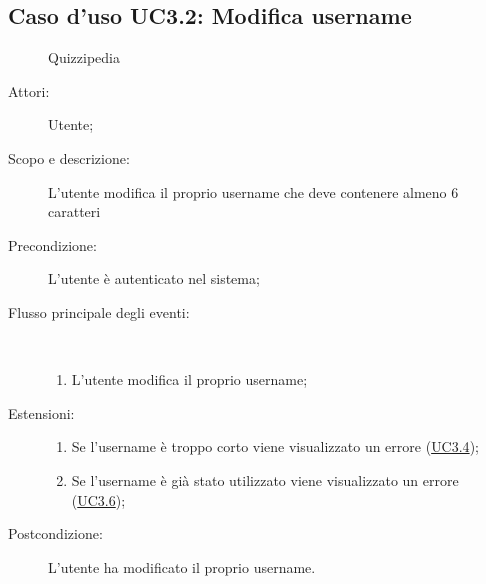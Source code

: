 \subsection{Caso d'uso UC3.2: Modifica username}
	\begin{figure}[H]
		\centering
		\begin{resizedtikzpicture}{\textwidth}
		\begin{umlsystem}[x=0, fill=lightgray!20]{Quizzipedia}
		\end{umlsystem}
		\end{resizedtikzpicture}
		\caption{}
	\end{figure}
\begin{description}
\item[Attori:] Utente;
\item[Scopo e descrizione:] L'utente modifica il proprio username che deve contenere almeno 6 caratteri
      \item[Precondizione:] L'utente è autenticato nel sistema;

        \item[Flusso principale degli eventi:] \ 
 \begin{enumerate}
          \item L’utente modifica il proprio username;

      \end{enumerate}
    \item[Estensioni:]
      \begin{enumerate}
          \item Se l'username è troppo corto viene visualizzato un errore (\hyperlink{UC3.4}{UC3.4});
          \item Se l'username è già stato utilizzato viene visualizzato un errore (\hyperlink{UC3.6}{UC3.6});

      \end{enumerate}
    \item[Postcondizione:] L'utente ha modificato il proprio username.
  \end{description}
\hypertarget{UC3.3}{}
